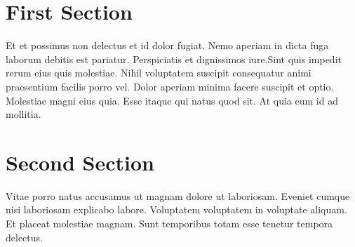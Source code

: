 \documentclass{scrbook}
\begin{document}
    \section{First Section}
        Et et possimus non delectus et id dolor fugiat. Nemo aperiam in
        dicta fuga laborum debitis est pariatur.  Perspiciatis et
        dignissimos iure.\footnotesize Sint quis impedit rerum eius quis molestiae.
        Nihil voluptatem suscipit consequatur animi praesentium facilis
        porro vel. 
        \pstart
        Dolor aperiam minima facere suscipit et optio.
        \pend
        Molestiae magni eius quia. Esse itaque qui natus quod sit. At
        quia eum id ad mollitia.
    \section{Second Section}
        Vitae porro natus accusamus ut magnam dolore ut laboriosam. Eveniet cumque nisi laboriosam explicabo labore. Voluptatem voluptatem in voluptate aliquam. Et placeat molestiae magnam. Sunt temporibus totam esse tenetur tempora delectus.
\end{document}

